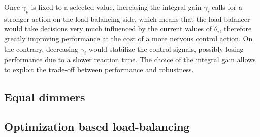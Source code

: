 Once $\gamma_p$ is fixed to a selected value, increasing the integral
gain $\gamma_i$ calls for a stronger action on the load-balancing
side, which means that the load-balancer would take decisions very
much influenced by the current values of $\theta_i$, therefore greatly
improving performance at the cost of a more nervous control action. On
the contrary, decreasing $\gamma_i$ would stabilize the control
signals, possibly losing performance due to a slower reaction
time. The choice of the integral gain allows to exploit the trade-off
between performance and robustness.

\subsection{Equal dimmers}

\subsection{Optimization based load-balancing}

	




